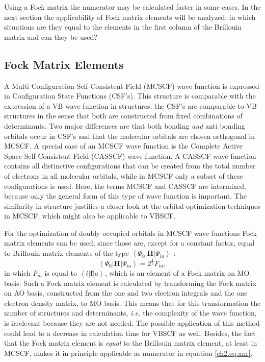 Using a Fock matrix the numerator may be calculated faster in some cases. In the next section the applicability of Fock matrix elements will be analyzed: in which situations are they equal to the elements in the first column of the Brillouin matrix and can they be used?

\subsection{\label{ch2.sec.fock}Fock Matrix Elements} 

A Multi Configuration Self-Consistent Field (MCSCF) \cite{wahldasbook,daswahl} wave function is expressed in Configuration State Functions (CSF's). This structure is comparable with the expression of a VB wave function in structures: the CSF's are comparable to VB structures in the sense that both are constructed from fixed combinations of determinants. Two major differences are that both bonding \textit{and} anti-bonding orbitals occur in CSF's and that the molecular orbitals are chosen orthogonal in MCSCF. A special case of an MCSCF wave function is the Complete Active Space Self-Consistent Field (CASSCF) wave function. A CASSCF wave function contains all distinctive configurations that can be created from the total number of electrons in all molecular orbitals, while in MCSCF only a subset of these configurations is used. Here, the terms MCSCF and CASSCF are intermixed, because only the general form of this type of wave function is important. The similarity in structure justifies a closer look at the orbital optimization techniques in MCSCF, which might also be applicable to VBSCF.

For the optimization of doubly occupied orbitals in MCSCF wave functions Fock matrix elements can be used, since those are, except for a constant factor, equal to Brillouin matrix elements of the type $\left < \Psi_0 | \mathbf{H} | \Psi_{ia} \right >$ \cite{roos1,roos2}:
\begin{equation}
\left < \Psi_0 | \mathbf{H} | \Psi_{ia} \right > = 2^{\frac{1}{2}}F_{ia},
\label{ch2.eq.mcscffock}
\end{equation}
in which $F_{ia}$ is equal to $\left < i | \mathbf{f} | a \right > $, which is an element of a Fock matrix on MO basis. Such a Fock matrix element is calculated by transforming the Fock matrix on AO basis, constructed from the one and two electron integrals and the one electron density matrix, to MO basis. This means that for this transformation the number of structures and determinants, \textit{i.e.} the complexity of the wave function, is irrelevant because they are not needed. The possible application of this method could lead to a decrease in calculation time for VBSCF as well. Besides, the fact that the Fock matrix element is \textit{equal} to the Brillouin matrix element, at least in MCSCF, makes it in principle applicable as numerator in equation \ref{ch2.eq.anr}.  

